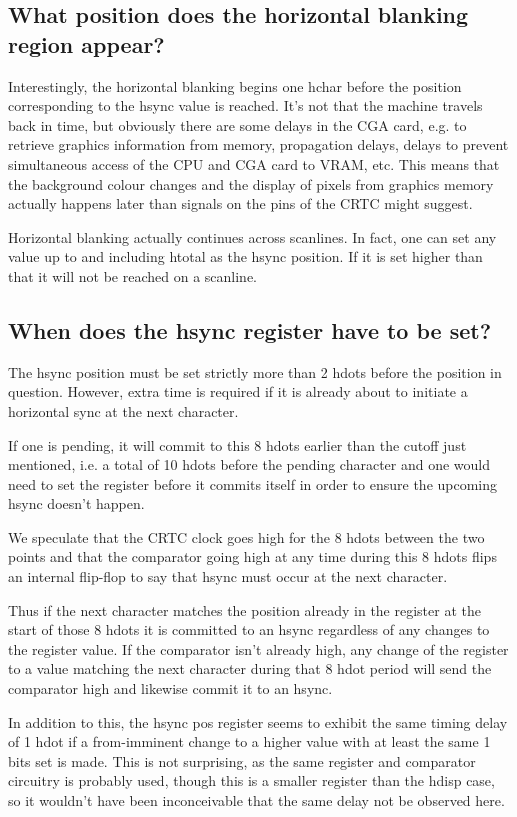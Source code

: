 \documentclass[a4paper,10pt]{amsart}
\begin{document}
\subsection{What position does the horizontal blanking region appear?}

Interestingly, the horizontal blanking begins one hchar before the position
corresponding to the hsync value is reached. It's not that the machine travels
back in time, but obviously there are some delays in the CGA card, e.g. to
retrieve graphics information from memory, propagation delays, delays to
prevent simultaneous access of the CPU and CGA card to VRAM, etc. This means
that the background colour changes and the display of pixels from graphics
memory actually happens later than signals on the pins of the CRTC might
suggest.

Horizontal blanking actually continues across scanlines. In fact, one can set
any value up to and including htotal as the hsync position. If it is set higher
than that it will not be reached on a scanline.

\subsection{When does the hsync register have to be set?}

The hsync position must be set strictly more than 2 hdots before the position
in question. However, extra time is required if it is already about to initiate
a horizontal sync at the next character.

If one is pending, it will commit to this 8 hdots earlier than the cutoff just
mentioned, i.e. a total of 10 hdots before the pending character and one would
need to set the register before it commits itself in order to ensure the
upcoming hsync doesn't happen.

We speculate that the CRTC clock goes high for the 8 hdots between the two
points and that the comparator going high at any time during this 8 hdots flips
an internal flip-flop to say that hsync must occur at the next character.

Thus if the next character matches the position already in the register at the
start of those 8 hdots it is committed to an hsync regardless of any changes to
the register value. If the comparator isn't already high, any change of the
register to a value matching the next character during that 8 hdot period will
send the comparator high and likewise commit it to an hsync.

In addition to this, the hsync pos register seems to exhibit the same timing
delay of 1 hdot if a from-imminent change to a higher value with at least the
same 1 bits set is made. This is not surprising, as the same register and
comparator circuitry is probably used, though this is a smaller register than
the hdisp case, so it wouldn't have been inconceivable that the same delay not
be observed here.
\end{document}
